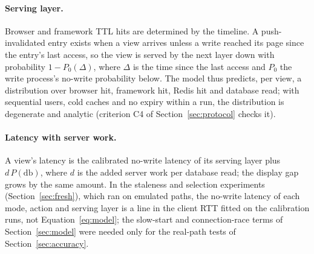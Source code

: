 \documentclass[acmsmall,review,nonacm]{acmart}
\begin{document}
\paragraph{Serving layer.}
Browser and framework TTL hits are determined by the timeline. A push-invalidated entry exists when a view arrives unless a write reached its page since the entry's last access, so the view is served by the next layer down with probability $1-P_0(\Delta)$, where $\Delta$ is the time since the last access and $P_0$ the write process's no-write probability below. The model thus predicts, per view, a distribution over browser hit, framework hit, Redis hit and database read; with sequential users, cold caches and no expiry within a run, the distribution is degenerate and analytic (criterion C4 of Section~\ref{sec:protocol} checks it).

\paragraph{Latency with server work.}
A view's latency is the calibrated no-write latency of its serving layer plus $d\,P(\text{db})$, where $d$ is the added server work per database read; the display gap grows by the same amount. In the staleness and selection experiments (Section~\ref{sec:fresh}), which ran on emulated paths, the no-write latency of each mode, action and serving layer is a line in the client RTT fitted on the calibration runs, not Equation~\ref{eq:model}; the slow-start and connection-race terms of Section~\ref{sec:model} were needed only for the real-path tests of Section~\ref{sec:accuracy}.
\end{document}
